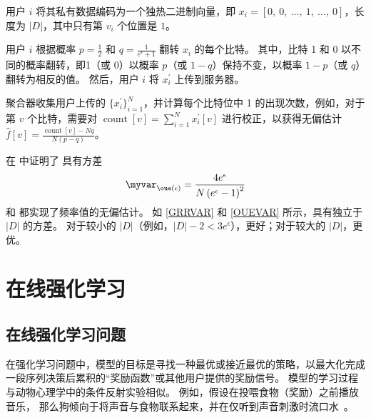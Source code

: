 用户 $i$ 将其私有数据编码为一个独热二进制向量，即 $ x_i = [0,\ 0,\ \ldots,\ 1,\ \ldots,\ 0]$，长度为 $|D|$，其中只有第 $v_i$ 个位置是 $1$。

用户 $i$ 根据概率 $p = \frac{1}{2}$ 和 $q = \frac{1}{e^\epsilon + 1}$ 翻转 $x_i$ 的每个比特。
其中，比特 1 和 0 以不同的概率翻转，即1（或 0）以概率 $p$（或 $1-q$）保持不变，以概率 $1-p$（或 $q$）翻转为相反的值。
然后，用户 $i$ 将 $x_i^{\prime}$ 上传到服务器。

聚合器收集用户上传的 $\{x_i^{\prime}\}_{i=1}^{N}$，并计算每个比特位中 1 的出现次数，例如，对于第 $v$ 个比特，需要对 $\operatorname{count}[v] = \sum_{i = 1}^{N} x_i^{\prime}[v]$ 进行校正，以获得无偏估计 $\hat{f}[v] = \frac{\operatorname{count}[v] - Nq}{N(p - q)}$。

在 \cite{wang2017locally} 中证明了 \oue 具有方差
\begin{equation}
\myvar_{\oue(\epsilon)} = \frac{4e^{\epsilon}}{N\left(e^{\epsilon}-1\right)^{2}}
\label{OUEVAR}
\end{equation}
\grr 和 \oue 都实现了频率值的无偏估计。
如 \autoref{GRRVAR} 和 \autoref{OUEVAR} 所示，\oue 具有独立于 $|D|$ 的方差。
对于较小的 $|D|$（例如，$|D|-2<3e^\epsilon$），\grr 更好；对于较大的 $|D|$，\oue 更优。


\section{在线强化学习}

\subsection{在线强化学习问题}
\label{sec:Reinforcement Learning Problem}
在强化学习问题中，模型的目标是寻找一种最优或接近最优的策略，以最大化完成一段序列决策后累积的“奖励函数”或其他用户提供的奖励信号。
模型的学习过程与动物心理学中的条件反射实验相似。
例如，假设在投喂食物（奖励）之前播放音乐，
那么狗倾向于将声音与食物联系起来，并在仅听到声音刺激时流口水~\cite{PG41}。


